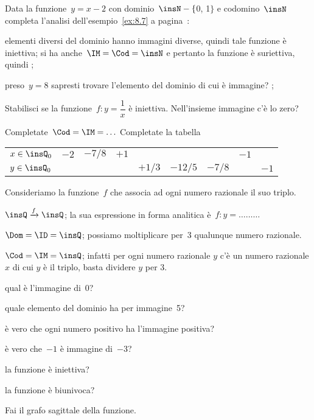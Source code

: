 
\begin{esercizio}
 \label{ese:\thechapter.7}
Data la funzione~$y=x-2$ con dominio~$\insN-\{$0, 1$\}$ e codomino~$\insN$ completa l'analisi dell'esempio~\ref{ex:8.7} a pagina~\pageref{ex:8.7}:
\begin{enumeratea}
\item elementi diversi del dominio hanno immagini diverse, quindi tale funzione è iniettiva;
si ha anche~$\IM =\Cod= \insN$ e pertanto la funzione è suriettiva, quindi \dotfill;
\item preso~$y = 8$ sapresti trovare l'elemento del dominio di cui è immagine? \dotfill;
\end{enumeratea}
\end{esercizio}

\begin{esercizio}
 \label{ese:\thechapter.8}
Stabilisci se la funzione~$f:y=\dfrac{1}{x}$ è
iniettiva. Nell'insieme immagine c'è lo zero?

Completate~$\Cod = \IM =\ldots$
Completate la tabella
\begin{center}
\begin{tabular}{l*8{c}}
\toprule
$x\in \insQ_{0}$ & $-2$ & $-7/8$ & $+1$ & & & & $-1$ & \\
$y\in \insQ_{0}$ & & & & $+1/3$ & $-12/5$ & $-7/8$ & & $-1$\\
\bottomrule
\end{tabular}
\end{center}
\end{esercizio}

\begin{esercizio}
 \label{ese:\thechapter.9}
Consideriamo la funzione~$f$ che associa ad ogni numero razionale il suo triplo.

$\insQ\xrightarrow{f}\insQ$; la sua espressione in forma
analitica è~$f: y = \dots\dots\dots$

$\Dom = \ID = \insQ$; possiamo moltiplicare per~3 qualunque numero razionale.

$\Cod = \IM =\insQ$; infatti per ogni numero razionale $y$ c'è un numero razionale $x$ di cui $y$ è il triplo, basta dividere $y$ per 3.
%

\begin{enumeratea}
\item qual è l'immagine di~0?\dotfill
\item quale elemento del dominio ha per immagine~5?\dotfill
\item è vero che ogni numero positivo ha l'immagine positiva?\dotfill
\item è vero che~$-1$ è immagine di~$-3$?\dotfill
\item la funzione è iniettiva?\dotfill
\item la funzione è biunivoca?\dotfill
\end{enumeratea}
Fai il grafo sagittale della funzione.
\end{esercizio}

